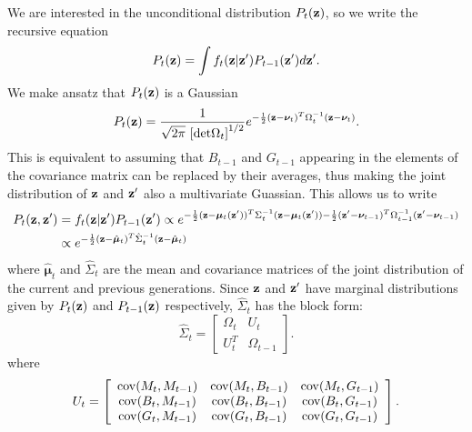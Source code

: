 \documentclass{article}
\newcommand{\bz}{{\bf z}}
\newcommand{\bmu}{{\boldsymbol \mu}}
\newcommand{\bnu}{{\boldsymbol \nu}}
\begin{document}
We are interested in the unconditional distribution $P_t(\bz)$, so we write the recursive equation
\begin{equation}
P_t(\bz) = \int f_t(\bz|\bz')P_{t-1}(\bz') d\bz'.
\end{equation}
We make ansatz that $P_t(\bz)$ is a Gaussian 
\begin{equation}
P_t(\bz) = \frac{1}{\sqrt{2\pi }\, \left[{\rm det}\Omega_{t}\right]^{1/2}} e^{-\frac{1}{2}(\bz-\bnu_{t})^T\Omega_{t}^{-1}(\bz-\bnu_{t})}.
\end{equation}
This is equivalent to assuming that $B_{t-1}$ and $G_{t-1}$ appearing in the elements of the covariance matrix can be replaced by their averages, thus making the joint distribution of $\bz$ and $\bz'$ also a multivariate Guassian. This allows us to write 
\begin{align}
\begin{split}
P_t(\bz,\bz') &= f_t(\bz|\bz')P_{t-1}(\bz') \propto e^{-\frac{1}{2}(\bz-\bmu_{t}(\bz'))^T\Sigma_{t}^{-1}(\bz-\bmu_{t}(\bz'))-\frac{1}{2}(\bz'-\bnu_{t-1})^T\Omega_{t-1}^{-1}(\bz'-\bnu_{t-1})}\\
&\propto e^{-\frac{1}{2}(\bz-\hat{\bmu}_t)^T\hat{\Sigma}_{t}^{-1}(\bz-\hat{\bmu}_{t})}
\end{split}
\end{align} 
where $\hat{\bmu}_t$ and $\hat{\Sigma}_{t}$ are the mean and covariance matrices of the joint distribution of the current and previous generations. 
Since $\bz$ and $\bz'$ have marginal distributions given by  $P_{t}(\bz)$ and $P_{t-1}(\bz)$ respectively, $\hat{\Sigma}_{t}$ has the block form:
\begin{equation}
\hat{\Sigma}_{t} = \left[ \begin{array}{cc}
\Omega_t  & U_t\\
U_t^T  &\Omega_{t-1} 
\end{array}\right].
\end{equation}
where 
\begin{equation}
U_t =\left[ \begin{array}{ccc}
{\rm cov}(M_t,M_{t-1})  &{\rm cov}(M_t,B_{t-1})  &{\rm cov}(M_t,G_{t-1}) \\
{\rm cov}(B_t,M_{t-1})  &{\rm cov}(B_t,B_{t-1})  &{\rm cov}(B_t,G_{t-1}) \\
{\rm cov}(G_t,M_{t-1})  &{\rm cov}(G_t,B_{t-1})  &{\rm cov}(G_t,G_{t-1}) 
\end{array}\right].
\end{equation}
\end{document}

